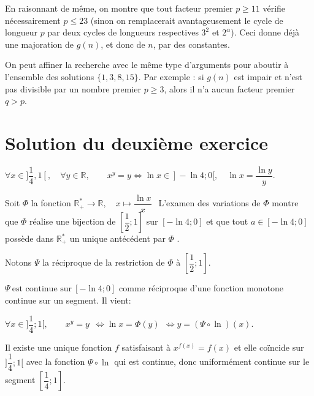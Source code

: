 En raisonnant de même, on montre que tout facteur premier $p \geq 11$ vérifie nécessairement $p \leq 23$ (sinon on remplacerait avantageusement le cycle de longueur $p$ par deux cycles de longueurs respectives $3^2$ et $2^\alpha$). Ceci donne déjà une majoration de $g(n)$, et donc de $n$, par des constantes.

On peut affiner la recherche avec le même type d'arguments pour aboutir à l'ensemble des solutions $\{1, 3,8,15\}$. Par exemple : si $g(n)$ est impair et n'est pas divisible par un nombre premier $p \geq 3$, alors il n'a aucun facteur premier $q > p$.


\section {Solution du deuxième exercice}%
$\forall x \in ]\dfrac 14, 1 [,\quad \forall y \in \mathbb R,\qquad  x^y= y \iff \ln x \in ]-\ln 4;0[, \quad \ln x = \dfrac {\ln y}y.$ 

Soit $\Phi$ la fonction $\mathbb R_+^* \to \mathbb R,\quad x \mapsto \dfrac {\ln x}x\:\:$ L'examen des variations  de $\Phi$  montre que $\Phi$ réalise une bijection de $[\dfrac 12; 1]$ sur $[-\ln4;0]$ et que tout $a \in [-\ln 4; 0] $ possède dans $\mathbb R_+^*$ un unique antécédent  par $\Phi$ .

Notons $ \Psi $ la réciproque de la restriction de $\Phi$ à $[ \dfrac 12 ; 1 ].$  

$\Psi  \: \text{est continue sur} \:[ -\ln 4; 0] $ comme réciproque d'une fonction monotone continue sur un segment. Il vient:

$ \forall x \in ]\dfrac 14; 1[, \qquad x^y =y\:\:\iff \ln x = \Phi(y)  \:\:\iff y = (\Psi \circ \ln) (x) $. 

Il existe une unique fonction $f$ satisfaisant à  $x ^{f(x)} = f(x) $ et elle coïncide sur $]\dfrac 14;1[$  avec la fonction $\Psi \circ \ln$  qui  est  continue,  donc uniformément continue sur le segment $[\dfrac 14; 1].$ 